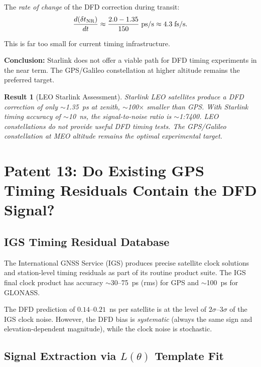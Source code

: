 \documentclass[aps,prd,twocolumn,superscriptaddress,nofootinbib]{revtex4-2}
\newcommand{\deltaT}{\delta t_{\rm NR}}
\newtheorem{result}{Result}
\begin{document}
The \emph{rate of change} of the DFD correction during transit:
\begin{equation}
\frac{d(\deltaT)}{dt} \approx
\frac{2.0 - 1.35}{150}\;\text{ps/s} \approx 4.3\;\text{fs/s}.
\end{equation}

This is far too small for current timing infrastructure.

\textbf{Conclusion:} Starlink does not offer a viable path for
DFD timing experiments in the near term. The GPS/Galileo constellation
at higher altitude remains the preferred target.

\begin{result}[LEO Starlink Assessment]
Starlink LEO satellites produce a DFD correction of only $\sim$1.35~ps
at zenith, $\sim$100$\times$ smaller than GPS. With Starlink timing
accuracy of $\sim$10~ns, the signal-to-noise ratio is $\sim$1:7400.
LEO constellations do not provide useful DFD timing tests.
The GPS/Galileo constellation at MEO altitude remains the optimal
experimental target.
\end{result}

\section{Patent 13: Do Existing GPS Timing Residuals Contain the DFD Signal?}
\label{sec:existing_residuals}

\subsection{IGS Timing Residual Database}

The International GNSS Service (IGS) produces precise satellite clock
solutions and station-level timing residuals as part of its routine
product suite. The IGS final clock product has accuracy
$\sim$30--75~ps (rms) for GPS and $\sim$100~ps for GLONASS.

The DFD prediction of $0.14$--$0.21$~ns per satellite is at the
level of $2\sigma$--$3\sigma$ of the IGS clock noise. However,
the DFD bias is \emph{systematic} (always the same sign and
elevation-dependent magnitude), while the clock noise is stochastic.

\subsection{Signal Extraction via $L(\theta)$ Template Fit}
\end{document}
